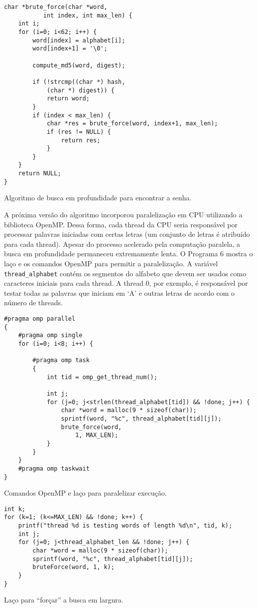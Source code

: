 \documentclass{sig-alternate-05-2015}
\begin{document}
\begin{program}
\begin{lstlisting}
char *brute_force(char *word, 
           int index, int max_len) {
    int i;
    for (i=0; i<62; i++) {
        word[index] = alphabet[i];
        word[index+1] = '\0';

        compute_md5(word, digest);

        if (!strcmp((char *) hash,
        	(char *) digest)) {
            return word;
        }
        if (index < max_len) {
            char *res = brute_force(word, index+1, max_len);
            if (res != NULL) {
                return res;
            }
        }
    }
    return NULL;
}
\end{lstlisting}
\caption{Algoritmo de busca em profundidade para encontrar a senha.}
\end{program}

A próxima versão do algoritmo incorporou paralelização em CPU utilizando a biblioteca OpenMP.
Dessa forma, cada thread da CPU seria responsável por processar palavras iniciadas com certas letras (um conjunto de letras é atribuído para cada thread).
Apesar do processo acelerado pela computação paralela, a busca em profundidade permaneceu extremamente lenta.
O Programa 6 mostra o laço e os comandos OpenMP para permitir a paralelização.
A variável \texttt{thread\_alphabet} contém os segmentos do alfabeto que devem ser usados como caracteres iniciais para cada thread.
A thread 0, por exemplo, é responsável por testar todas as palavras que iniciam em `A' e outras letras de acordo com o número de threads. 

\begin{program}
\begin{lstlisting}
#pragma omp parallel
{
    #pragma omp single
    for (i=0; i<8; i++) {

        #pragma omp task
        {
            int tid = omp_get_thread_num();

            int j;
            for (j=0; j<strlen(thread_alphabet[tid]) && !done; j++) {
                char *word = malloc(9 * sizeof(char));
                sprintf(word, "%c", thread_alphabet[tid][j]);
                brute_force(word, 
                    1, MAX_LEN);                        
            }
        }
    }
    #pragma omp taskwait
}\end{lstlisting}
\caption{Comandos OpenMP e laço para paralelizar execução.}
\end{program}

\begin{program}
\begin{lstlisting}
int k;
for (k=1; (k<=MAX_LEN) && !done; k++) {
    printf("thread %d is testing words of length %d\n", tid, k);
    int j;
    for (j=0; j<thread_alphabet_len && !done; j++) {
        char *word = malloc(9 * sizeof(char));
        sprintf(word, "%c", thread_alphabet[tid][j]);
        bruteForce(word, 1, k);                        
    }
}
\end{lstlisting}
\caption{Laço para ``forçar'' a busca em largura.}
\end{program}
\end{document}
